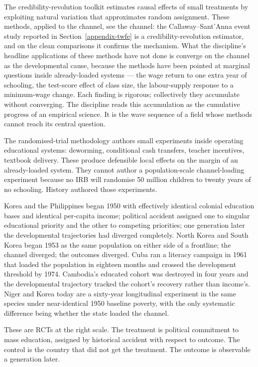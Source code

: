 \documentclass[12pt,letterpaper]{article}
\begin{document}
{The credibility-revolution toolkit estimates causal effects of small
treatments by exploiting natural variation that approximates random
assignment. These methods, applied to the channel, see the channel:
the Callaway--Sant'Anna event study reported in
Section~\ref{appendix-twfe} is a credibility-revolution estimator,
and on the clean comparisons it confirms the mechanism. What the
discipline's headline applications of these methods have not done is
converge on the channel as the developmental cause, because the
methods have been pointed at marginal questions inside already-loaded
systems --- the wage return to one extra year of schooling, the
test-score effect of class size, the labour-supply response to a
minimum-wage change. Each finding is rigorous; collectively they
accumulate without converging. The discipline reads this accumulation
as the cumulative progress of an empirical science. It is the wave
sequence of a field whose methods cannot reach its central question.

The randomised-trial methodology authors small experiments inside
operating educational systems: deworming, conditional cash transfers,
teacher incentives, textbook delivery. These produce defensible local
effects on the margin of an already-loaded system. They cannot author
a population-scale channel-loading experiment because no IRB will
randomise 50 million children to twenty years of no schooling. History
authored those experiments.

Korea and the Philippines began 1950 with
effectively identical colonial education bases and identical
per-capita income; political accident assigned one to singular
educational priority and the other to competing priorities; one
generation later the developmental trajectories had diverged completely.
North Korea and South Korea began 1953 as the same population on
either side of a frontline; the channel diverged; the outcomes
diverged. Cuba ran a literacy campaign in 1961 that loaded the
population in eighteen months and crossed the development threshold by
1974. Cambodia's educated cohort was destroyed in four years and the
developmental trajectory tracked the cohort's recovery rather than
income's. Niger and Korea today are a sixty-year longitudinal
experiment in the same species under near-identical 1950 baseline
poverty, with the only systematic difference being whether the state
loaded the channel.

These are RCTs at the right scale. The treatment
is political commitment to mass education, assigned by historical
accident with respect to outcome. The control is the country that did
not get the treatment. The outcome is observable a generation later.

}
\end{document}
